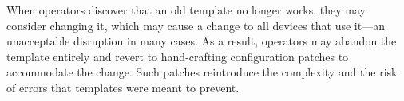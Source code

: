 \documentclass[numbers, 10pt, preprint]{sigplanconf}
\newcommand{\IE}{\emph{i.e.}}
\begin{document}
When operators discover that an old template no longer works, they may consider changing it, which may cause a change to all devices that use it---an unacceptable disruption in many cases.  As a result, operators may abandon the template entirely and revert to hand-crafting configuration patches to accommodate the change.
Such patches reintroduce the complexity and the risk of errors that templates were meant to prevent.





\end{document}
